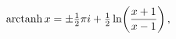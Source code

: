 \[\mathop{\mathrm{arctanh}\/}\nolimits x=\pm\tfrac{1}{2}\pi i+\tfrac{1}{2}%
\mathop{\ln\/}\nolimits\!\left(\frac{x+1}{x-1}\right),\]